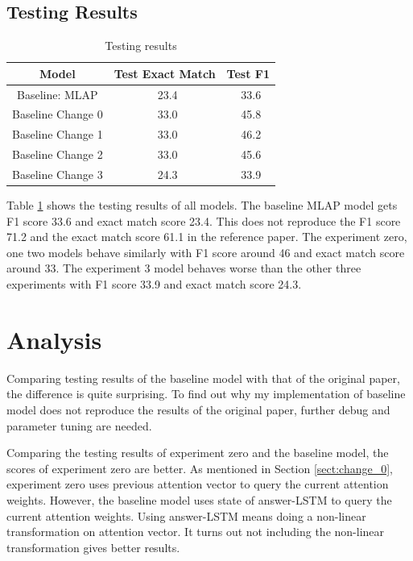 \documentclass[modernstyle,12pt]{sjsuthesis}
\theoremstyle{definition}
\begin{document}
\subsection{Testing Results}

\begin{table}[htbp]\centering
  \caption{Testing results}
  \label{tab:test_results}
  \begin{tabular}{|c|c|c|}
    \hline
    Model& Test Exact Match & Test F1 \\
    \hline\hline
    Baseline: MLAP & \ 23.4 &\ 33.6 \\
    Baseline Change 0& \ 33.0 &\ 45.8 \\
    Baseline Change 1 & \ 33.0 &\ 46.2 \\
    Baseline Change 2 & \ 33.0 &\ 45.6 \\
    Baseline Change 3 & \ 24.3 &\ 33.9 \\
    \hline
  \end{tabular}
\end{table}

Table \ref{tab:test_results} shows the testing results of all models. The baseline MLAP model gets F1 score 33.6 and exact match score 23.4. This does not reproduce the F1 score 71.2 and the exact match score 61.1 in the reference paper\cite{wang2016machine}. The experiment zero, one two models behave similarly with F1 score around 46 and exact match score around 33. The experiment 3 model behaves worse than the other three experiments with F1 score 33.9 and exact match score 24.3.




\section{Analysis}

Comparing testing results of the baseline model with that of the original paper, the difference is quite surprising. To find out why my implementation of baseline model does not reproduce the results of the original paper, further debug and parameter tuning are needed.

Comparing the testing results of experiment zero and the baseline model, the scores of experiment zero are better. As mentioned in Section \ref{sect:change_0}, experiment zero uses previous attention vector to query the current attention weights. However, the baseline model uses state of answer-LSTM to query the current attention weights. Using answer-LSTM means doing a non-linear transformation on attention vector. It turns out not including the non-linear transformation gives better results.
\end{document}
